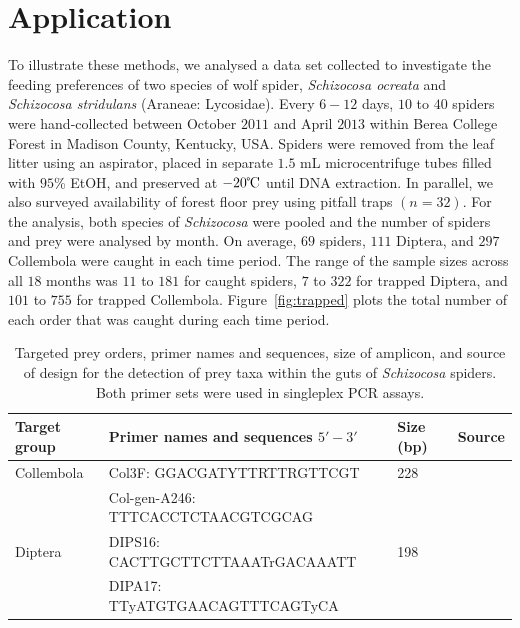 \documentclass[smallextended]{svjour3}
\begin{document}
\section{Application}
\label{sec:data}

To illustrate these methods, we analysed a data set collected to investigate the feeding preferences of two species of wolf spider, \textit{Schizocosa ocreata} and \textit{Schizocosa stridulans} (Araneae: Lycosidae).  Every $6-12$ days, $10$ to $40$ spiders were hand-collected between October $2011$ and April $2013$ within Berea College Forest in Madison County, Kentucky, USA.  Spiders were removed from the leaf litter using an aspirator, placed in separate $1.5$ mL microcentrifuge tubes filled with $95$\% EtOH, and preserved at $-20\celsius$ until DNA extraction.  In parallel, we also surveyed availability of forest floor prey using pitfall traps $(n = 32)$.  For the analysis, both species of \textit{Schizocosa} were pooled and the number of spiders and prey were analysed by month.  On average, $69$ spiders, $111$ Diptera, and $297$ Collembola were caught in each time period.  The range of the sample sizes across all $18$ months was $11$ to $181$ for caught spiders, $7$ to $322$ for trapped Diptera, and $101$ to $755$ for trapped Collembola.  Figure~\ref{fig:trapped} plots the total number of each order that was caught during each time period.

\begin{table}
  \label{tab:s1}
  \centering
  \begin{tabular}{llll}
    \hline
    \textbf{Target group} & \textbf{Primer names and sequences} $5'-3'$ & \textbf{Size (bp)} & \textbf{Source}\\
    \hline
    Collembola & Col3F: GGACGATYTTRTTRGTTCGT & 228 & \citet{Sint:2012} \\
    & Col-gen-A246: TTTCACCTCTAACGTCGCAG & & \\
    Diptera & DIPS16: CACTTGCTTCTTAAATrGACAAATT & 198 & \citet{Eitzinger:2014} \\
    & DIPA17: TTyATGTGAACAGTTTCAGTyCA &  & \\
  \end{tabular}
  \caption{Targeted prey orders, primer names and sequences, size of amplicon, and source of design for the detection of prey taxa within the guts of \textit{Schizocosa} spiders.  Both primer sets were used in singleplex PCR assays.}
\end{table}
\end{document}
